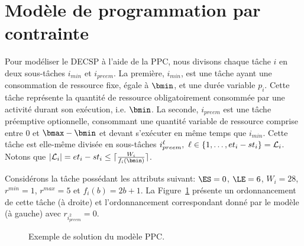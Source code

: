 \section{Modèle de programmation par contrainte}

Pour modéliser le DECSP à l'aide de la PPC, nous divisons chaque tâche
$i$ en deux sous-tâches $i_{min}$ et $i_{preem}$. La première,
$i_{min}$, est une tâche ayant une consommation de ressource fixe,
égale à $\bmin$, et une durée variable $p_i$. Cette tâche
représente la quantité de ressource obligatoirement consommée par une
activité durant son exécution, i.e. $\bmin$.  La seconde, $i_{preem}$
est une tâche préemptive optionnelle, consommant une quantité variable
de ressource comprise entre $0$ et $\bmax-\bmin$ et devant s'exécuter
en même temps que $i_{min}$. Cette tâche est elle-même divisée en
sous-tâches $i_{preem}^\ell,\ \ell \in \{1,\dots, et_i-st_i\}={\cal L}_i$. Notons
que $|{\cal L}_i|=et_i - st_i \le \lceil \frac{W_i}{f_i(\bmin)}\rceil$. 
\begin{ex}
Considérons la tâche possédant les attributs suivant:  $\ES= 0$,
$\LE=6$, $W_i=28$, $r^{min}=1$,
$r^{max}=5$ et $f_i(b)=2b+1$. La Figure~\ref{fig:ex:PPC} présente un
ordonnancement de cette tâche (à droite) et l'ordonnancement
correspondant donné par le modèle (à gauche) avec $r_{i^2_{preem}}=0$. 
\begin{figure}[!htb]
  \centering
  \caption{Exemple de solution du modèle PPC.}
  \label{fig:ex:PPC}
\end{figure}
\end{ex}
